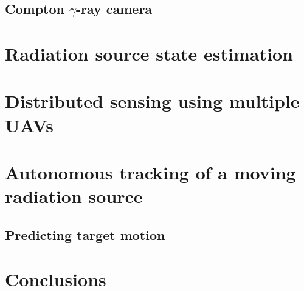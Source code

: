 \documentclass[a4paper,12pt,titlepage, twoside]{article}
\begin{document}

\subsection{Compton $\gamma$-ray camera}



\section{Radiation source state estimation}



\section{Distributed sensing using multiple UAVs}



\section{Autonomous tracking of a moving radiation source}

\subsection{Predicting target motion}



\section{Conclusions}




\clearpage
{}
\cleardoublepage

\clearpage




\end{document}
